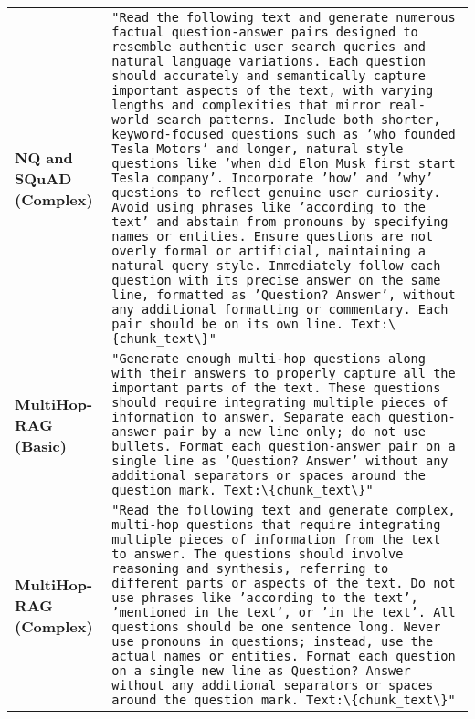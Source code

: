 \begin{table*}[t]
\begin{tabular}{p{3.2cm} p{13.0cm}}
\textbf{NQ and SQuAD (Complex)}
&
\footnotesize
\texttt{"Read the following text and generate numerous factual question-answer pairs designed to resemble authentic user search queries and natural language variations. Each question should accurately and semantically capture important aspects of the text, with varying lengths and complexities that mirror real-world search patterns. Include both shorter, keyword-focused questions such as 'who founded Tesla Motors' and longer, natural style questions like 'when did Elon Musk first start Tesla company'. Incorporate 'how' and 'why' questions to reflect genuine user curiosity. Avoid using phrases like 'according to the text' and abstain from pronouns by specifying names or entities. Ensure questions are not overly formal or artificial, maintaining a natural query style. Immediately follow each question with its precise answer on the same line, formatted as 'Question? Answer', without any additional formatting or commentary. Each pair should be on its own line. Text:\textbackslash\{chunk\_text\textbackslash\}"} \\[1em]
\textbf{MultiHop-RAG (Basic)} 
& 
\footnotesize
\texttt{"Generate enough multi-hop questions along with their answers to properly capture all the important parts of the text. These questions should require integrating multiple pieces of information to answer. Separate each question-answer pair by a new line only; do not use bullets. Format each question-answer pair on a single line as 'Question? Answer' without any additional separators or spaces around the question mark. Text:\textbackslash\{chunk\_text\textbackslash\}"} \\[1em]
\textbf{MultiHop-RAG (Complex)} 
& 
\footnotesize
\texttt{"Read the following text and generate complex, multi-hop questions that require integrating multiple pieces of information from the text to answer. The questions should involve reasoning and synthesis, referring to different parts or aspects of the text. Do not use phrases like 'according to the text', 'mentioned in the text', or 'in the text'. All questions should be one sentence long. Never use pronouns in questions; instead, use the actual names or entities. Format each question on a single new line as Question? Answer without any additional separators or spaces around the question mark. Text:\textbackslash\{chunk\_text\textbackslash\}"} \\[1em]
\bottomrule
\end{tabular}
\end{table*}

